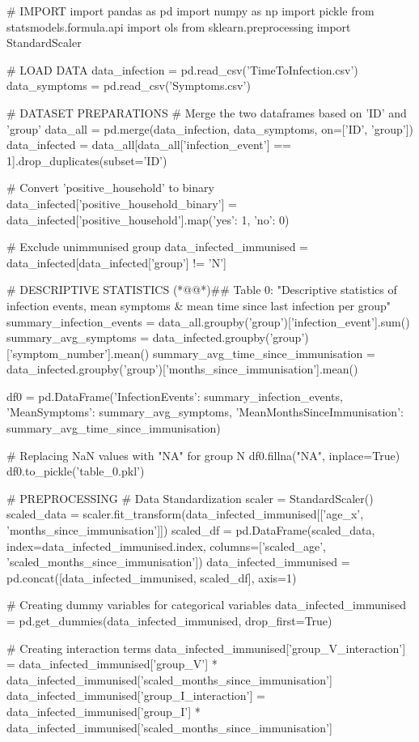 \documentclass[11pt]{article}
\begin{document}
\begin{python}

# IMPORT
import pandas as pd
import numpy as np
import pickle
from statsmodels.formula.api import ols
from sklearn.preprocessing import StandardScaler

# LOAD DATA
data_infection = pd.read_csv('TimeToInfection.csv')
data_symptoms = pd.read_csv('Symptoms.csv')

# DATASET PREPARATIONS
# Merge the two dataframes based on 'ID' and 'group'
data_all = pd.merge(data_infection, data_symptoms, on=['ID', 'group'])
data_infected = data_all[data_all['infection_event'] == 1].drop_duplicates(subset='ID')

# Convert 'positive_household' to binary
data_infected['positive_household_binary'] = data_infected['positive_household'].map({'yes': 1, 'no': 0})

# Exclude unimmunised group
data_infected_immunised = data_infected[data_infected['group'] != 'N']

# DESCRIPTIVE STATISTICS
(*@@*)## Table 0: "Descriptive statistics of infection events, mean symptoms & mean time since last infection per group"
summary_infection_events = data_all.groupby('group')['infection_event'].sum()
summary_avg_symptoms = data_infected.groupby('group')['symptom_number'].mean()
summary_avg_time_since_immunisation = data_infected.groupby('group')['months_since_immunisation'].mean()

df0 = pd.DataFrame({'InfectionEvents': summary_infection_events, 
                    'MeanSymptoms': summary_avg_symptoms,
                    'MeanMonthsSinceImmunisation': summary_avg_time_since_immunisation})

# Replacing NaN values with "NA" for group N
df0.fillna("NA", inplace=True)
df0.to_pickle('table_0.pkl')

# PREPROCESSING
# Data Standardization
scaler = StandardScaler()
scaled_data = scaler.fit_transform(data_infected_immunised[['age_x', 'months_since_immunisation']])
scaled_df = pd.DataFrame(scaled_data, index=data_infected_immunised.index, columns=['scaled_age', 'scaled_months_since_immunisation'])
data_infected_immunised = pd.concat([data_infected_immunised, scaled_df], axis=1)

# Creating dummy variables for categorical variables
data_infected_immunised = pd.get_dummies(data_infected_immunised, drop_first=True)

# Creating interaction terms
data_infected_immunised['group_V_interaction'] = data_infected_immunised['group_V'] * data_infected_immunised['scaled_months_since_immunisation']
data_infected_immunised['group_I_interaction'] = data_infected_immunised['group_I'] * data_infected_immunised['scaled_months_since_immunisation']


\end{python}
\end{document}
